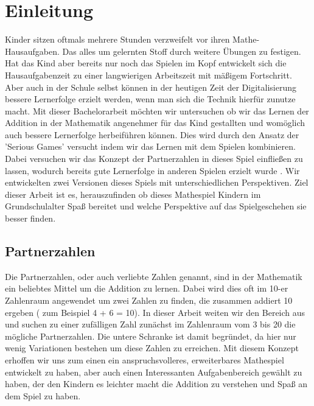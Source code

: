 
\chapter{Einleitung}
Kinder sitzen oftmals mehrere Stunden verzweifelt vor ihren Mathe-Hausaufgaben. Das alles um gelernten Stoff durch weitere Übungen zu festigen. Hat das Kind aber bereits nur noch das Spielen im Kopf entwickelt sich die Hausaufgabenzeit zu einer langwierigen Arbeitszeit mit mäßigem Fortschritt. Aber auch in der Schule selbst können in der heutigen Zeit der Digitalisierung bessere Lernerfolge erzielt werden, wenn man sich die Technik hierfür zunutze macht. Mit dieser Bachelorarbeit möchten wir untersuchen ob wir das Lernen der Addition in der Mathematik angenehmer für das Kind gestallten und womöglich auch bessere Lernerfolge herbeiführen können. Dies wird durch den Ansatz der 'Serious Games' versucht indem wir das Lernen mit dem Spielen kombinieren. Dabei versuchen wir das Konzept der Partnerzahlen in dieses Spiel einfließen zu lassen, wodurch bereits gute Lernerfolge in anderen Spielen erzielt wurde \cite{Jung2016}. Wir entwickelten zwei Versionen dieses Spiels mit unterschiedlichen Perspektiven. Ziel dieser Arbeit ist es, herauszufinden ob dieses Mathespiel Kindern im Grundschulalter Spaß bereitet und welche Perspektive auf das Spielgeschehen sie besser finden.
\section{Partnerzahlen}
Die Partnerzahlen, oder auch verliebte Zahlen genannt, sind in der Mathematik ein beliebtes Mittel um die Addition zu lernen. Dabei wird dies oft im 10-er Zahlenraum angewendet um zwei Zahlen zu finden, die zusammen addiert 10 ergeben ( zum Beispiel 4 + 6 = 10). In dieser Arbeit weiten wir den Bereich aus und suchen zu einer zufälligen Zahl zunächst im Zahlenraum vom 3 bis 20 die mögliche Partnerzahlen. Die untere Schranke ist damit begründet, da hier nur wenig Variationen bestehen um diese Zahlen zu erreichen. Mit diesem Konzept erhoffen wir uns zum einen ein anspruchsvolleres, erweiterbares Mathespiel entwickelt zu haben, aber auch einen Interessanten Aufgabenbereich gewählt zu haben, der den Kindern es leichter macht die Addition zu verstehen und Spaß an dem Spiel zu haben.
